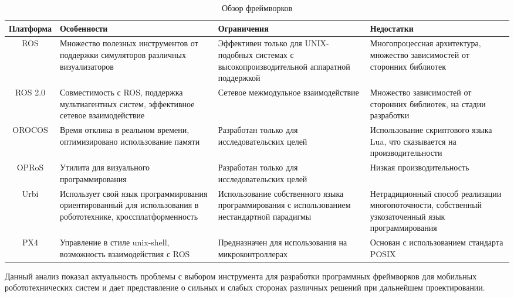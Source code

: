 \begin{table}
    \caption{\label{tab:frameworks}Обзор фреймворков}
    \begin{center}
        \begin{tabularx}{\textwidth}{|c|X|X|X|}
            \hline
            Платформа & Особенности & Ограничения & Недостатки \\
            \hline
            ROS & Множество полезных инструментов от поддержки симуляторов различных визуализаторов & Эффективен только для UNIX-подобных системах с высокопроизводительной аппаратной поддержкой & Многопроцессная архитектура, множество зависимостей от сторонних библиотек \\
            \hline
            ROS 2.0 & Совместимость с ROS, поддержка 
            мультиагентных систем, эффективное сетевое 
            взаимодействие & Сетевое межмодульное взаимодействие 
            & Множество зависимостей от сторонних библиотек, на 
            стадии разработки \\
            \hline
            OROCOS & Время отклика в реальном времени, 
            оптимизировано использование памяти & Разработан 
            только для исследовательских целей & Использование 
            скриптового языка Lua, что сказывается на 
            производительности \\
            \hline
            OPRoS & Утилита для визуального программирования & Разработан только для исследовательских целей & Низкая производительность \\
            \hline
            Urbi & Использует свой язык программирования ориентированный для использования в робототехнике, кроссплатформенность & Использование собственного языка программирования с использованием нестандартной парадигмы & Нетрадиционный способ реализации многопоточности, собственный узкозаточенный язык программирования \\
            \hline
            PX4 & Управление в стиле unix-shell, возможность взаимодействия с ROS & Предназначен для использования на микроконтроллерах & Основан с использованием стандарта POSIX \\
            \hline
        \end{tabularx}
    \end{center}
\end{table}

Данный анализ показал актуальность проблемы с выбором инструмента для разработки программных фреймворков для мобильных робототехнических систем и дает представление о сильных и слабых сторонах различных решений при дальнейшем проектировании. 